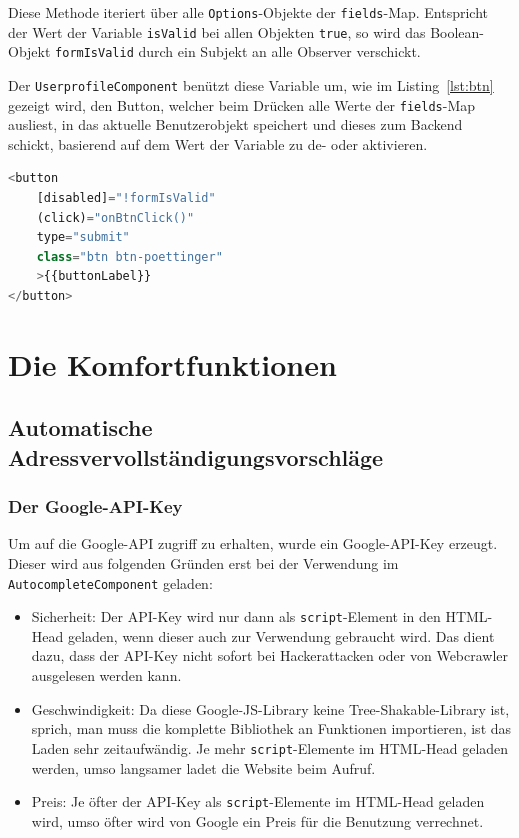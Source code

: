 Diese Methode iteriert über alle \texttt{Options}-Objekte der \texttt{fields}-Map. Entspricht der Wert der Variable \texttt{isValid} bei allen Objekten \texttt{true}, so wird das Boolean-Objekt \texttt{formIsValid} durch ein Subjekt an alle Observer verschickt.

Der \texttt{UserprofileComponent} benützt diese Variable um, wie im Listing~\ref{lst:btn} gezeigt wird, den Button, welcher beim Drücken alle Werte der \texttt{fields}-Map ausliest, in das aktuelle Benutzerobjekt speichert und dieses zum Backend schickt, basierend auf dem Wert der Variable zu de- oder aktivieren.

\begin{lstlisting}[caption={Der Button im \texttt{UserprofileComponent}, welcher de- oder aktiviert wird}, language=JavaScript,label={lst:btn}]
<button 
	[disabled]="!formIsValid" 
	(click)="onBtnClick()" 
	type="submit"
	class="btn btn-poettinger"
	>{{buttonLabel}}
</button>
\end{lstlisting}

\section{Die Komfortfunktionen}
\subsection{Automatische Adressvervollständigungsvorschläge}
\subsubsection{Der Google-API-Key}
Um auf die Google-API zugriff zu erhalten, wurde ein Google-API-Key erzeugt. Dieser wird aus folgenden Gründen erst bei der Verwendung im \texttt{AutocompleteComponent} geladen:

\begin{itemize}
	
	\item Sicherheit: Der API-Key wird nur dann als \texttt{script}-Element in den HTML-Head geladen, wenn dieser auch zur Verwendung gebraucht wird. Das dient dazu, dass der API-Key nicht sofort bei Hackerattacken oder von Webcrawler ausgelesen werden kann.
	
	\item Geschwindigkeit: Da diese Google-JS-Library keine Tree-Shakable-Library ist, sprich, man muss die komplette Bibliothek an Funktionen importieren, ist das Laden sehr zeitaufwändig. Je mehr \texttt{script}-Elemente im HTML-Head geladen werden, umso langsamer ladet die Website beim Aufruf.
	
	\item Preis: Je öfter der API-Key als \texttt{script}-Elemente im HTML-Head geladen wird, umso öfter wird von Google ein Preis für die Benutzung verrechnet.
\end{itemize}

